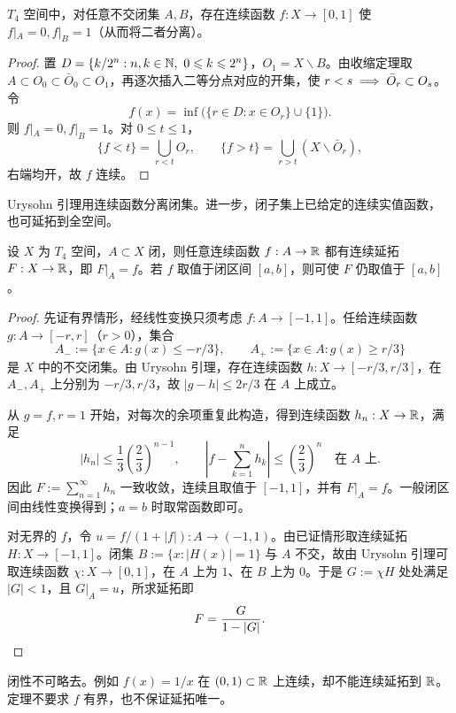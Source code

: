 \begin{lemma}[Urysohn]\label{lem:urysohn-separation}
    $T_4$ 空间中，对任意不交闭集 $A,B$，存在连续函数 $f:X\to[0,1]$ 使 $f|_A=0,f|_B=1$（从而将二者分离）。
\end{lemma}
\begin{proof}
    置 $D=\{k/2^n:n,k\in\N,\ 0\leqslant k\leqslant2^n\}$，$O_1=X\backslash B$。由收缩定理取 $A\subset O_0\subset\bar O_0\subset O_1$，再逐次插入二等分点对应的开集，使 $r<s\implies\bar O_r\subset O_s$。令
    \[
        f(x)=\inf\bigl(\{r\in D:x\in O_r\}\cup\{1\}\bigr).
    \]
    则 $f|_A=0,f|_B=1$。对 $0\leqslant t\leqslant1$，
    \[
        \{f<t\}=\bigcup_{r<t}O_r,\qquad
        \{f>t\}=\bigcup_{r>t}(X\backslash\bar O_r),
    \]
    右端均开，故 $f$ 连续。
\end{proof}

Urysohn 引理用连续函数分离闭集。进一步，闭子集上已给定的连续实值函数，也可延拓到全空间。

\begin{theorem}\label{thm:tietze-extension}
    设 $X$ 为 $T_4$ 空间，$A\subset X$ 闭，则任意连续函数 $f:A\to\mathbb{R}$ 都有连续延拓 $F:X\to\mathbb{R}$，即 $F|_A=f$。若 $f$ 取值于闭区间 $[a,b]$，则可使 $F$ 仍取值于 $[a,b]$。
\end{theorem}
\begin{proof}
    先证有界情形，经线性变换只须考虑 $f:A\to[-1,1]$。任给连续函数 $g:A\to[-r,r]$（$r>0$），集合
    \[
        A_-:=\{x\in A:g(x)\leqslant-r/3\},\qquad
        A_+:=\{x\in A:g(x)\geqslant r/3\}
    \]
    是 $X$ 中的不交闭集。由 Urysohn 引理，存在连续函数 $h:X\to[-r/3,r/3]$，在 $A_-,A_+$ 上分别为 $-r/3,r/3$，故 $|g-h|\leqslant2r/3$ 在 $A$ 上成立。

    从 $g=f,r=1$ 开始，对每次的余项重复此构造，得到连续函数 $h_n:X\to\mathbb{R}$，满足
    \[
        |h_n|\leqslant\frac13\left(\frac23\right)^{n-1},\qquad
        \left|f-\sum_{k=1}^nh_k\right|\leqslant\left(\frac23\right)^n\quad\text{在 }A\text{ 上}.
    \]
    因此 $F:=\sum_{n=1}^\infty h_n$ 一致收敛，连续且取值于 $[-1,1]$，并有 $F|_A=f$。一般闭区间由线性变换得到；$a=b$ 时取常函数即可。

    对无界的 $f$，令 $u=f/(1+|f|):A\to(-1,1)$。由已证情形取连续延拓 $H:X\to[-1,1]$。闭集 $B:=\{x:|H(x)|=1\}$ 与 $A$ 不交，故由 Urysohn 引理可取连续函数 $\chi:X\to[0,1]$，在 $A$ 上为 $1$、在 $B$ 上为 $0$。于是 $G:=\chi H$ 处处满足 $|G|<1$，且 $G|_A=u$，所求延拓即
    \[
        F=\frac{G}{1-|G|}.\qedhere
    \]
\end{proof}
\begin{remark}
    闭性不可略去。例如 $f(x)=1/x$ 在 $(0,1)\subset\mathbb{R}$ 上连续，却不能连续延拓到 $\mathbb{R}$。定理不要求 $f$ 有界，也不保证延拓唯一。
\end{remark}

